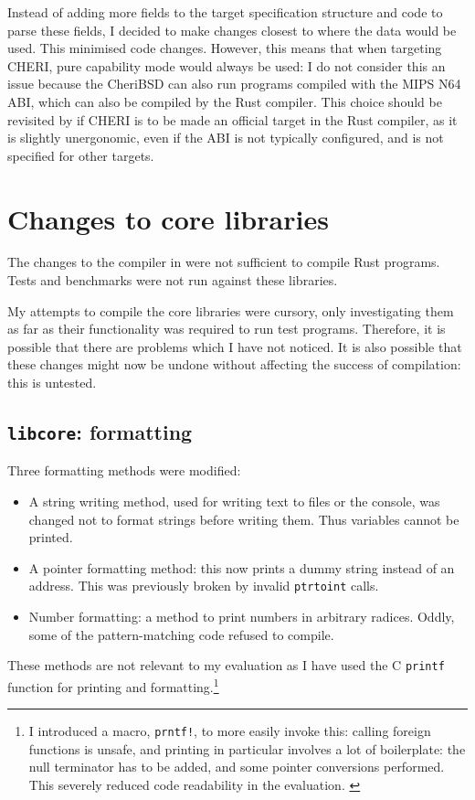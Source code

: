 \documentclass[dissertation.tex]{subfiles}
\begin{document}
Instead of adding more fields to the target specification structure and
code to parse these fields, I decided to make changes closest to where
the data would be used.
This minimised code changes.
However, this means that when targeting CHERI, pure capability mode
would always be used: I do not consider this an issue because the
CheriBSD can also run programs compiled with the MIPS N64 ABI, which can
also be compiled by the Rust compiler.
This choice should be revisited by if CHERI is to be made an official
target in the Rust compiler, as it is slightly unergonomic, even if the
ABI is not typically configured, and is not specified for other targets.


\section{Changes to core libraries}
\label{sec:impl-div-lib}

The changes to the compiler in  were not
sufficient to compile Rust programs.
Tests and benchmarks were not run against these libraries.

My attempts to compile the core libraries were cursory, only
investigating them as far as their functionality was required to run
test programs.
Therefore, it is possible that there are problems which I have not
noticed.
It is also possible that these changes might now be undone without
affecting the success of compilation: this is untested.

\subsection{\texttt{libcore}: formatting}
Three formatting methods were modified:

\begin{itemize}
    \item A string writing method, used for writing text to files or the
    console, was changed not to format strings before writing them.
    Thus variables cannot be printed.
    \item A pointer formatting method: this now prints a dummy string
    instead of an address.
    This was previously broken by invalid \texttt{ptrtoint} calls.
    \item Number formatting: a method to print numbers in arbitrary
    radices.
    Oddly, some of the pattern-matching code refused to compile.
\end{itemize}

These methods are not relevant to my evaluation as I have used the C
\texttt{printf} function for printing and formatting.\footnote{
I introduced a macro, \texttt{prntf!}, to more easily invoke this:
calling foreign functions is unsafe, and printing in particular involves
a lot of boilerplate: the null terminator has to be added, and some
pointer conversions performed.
This severely reduced code readability in the evaluation.
\label{foot:prntf}
}
\end{document}

